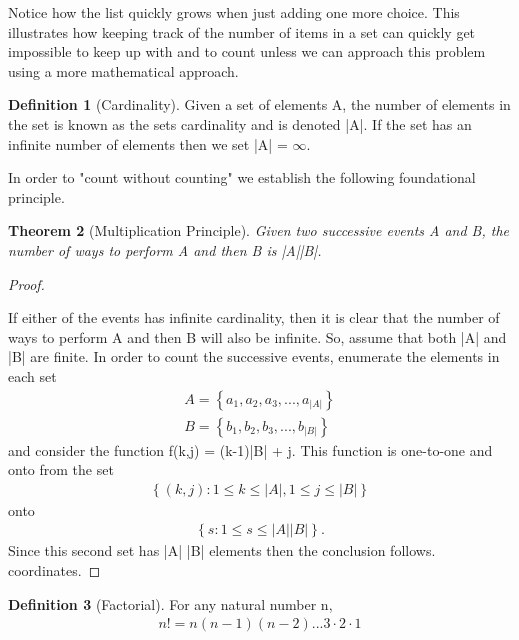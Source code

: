 \documentclass[10pt,]{book}
\theoremstyle{plain}
\newtheorem{theorem}{Theorem}[section]
\theoremstyle{definition}
\newtheorem{definition}[theorem]{Definition}
\theoremstyle{definition}
\numberwithin{equation}{section}
\begin{document}
Notice how the list quickly grows when just adding one more choice. This illustrates how keeping track of the number of items in a set can quickly get impossible to keep up with and to count unless we can approach this problem using a more mathematical approach.
%
\begin{definition}[Cardinality]\label{definition-17}
Given a set of elements A, the number of elements in the 
		set is known as the sets cardinality and is denoted |A|. If the set has 
		an infinite number of elements then we set |A| = \(\infty\).
		\end{definition}
\par
In order to "count without counting" we establish the following 
	foundational principle.%
\begin{theorem}[Multiplication Principle]\label{theorem-9}
Given two successive events A and B, the number of ways 
		to perform A and then B is |A||B|.
		\end{theorem}
\begin{proof}\hypertarget{proof-6}{}
If either of the events has infinite cardinality, then it is 
			clear
			that the number of ways to perform A and then B will also be 
			infinite. So, assume that both |A| and |B| are finite.
			In order to count the successive events, enumerate the elements in
			each set
			\begin{gather*}
A = \left \{ a_1, a_2, a_3, ... , a_{|A|} \right \}\\
B = \left \{  b_1, b_2, b_3, ... , b_{|B|} \right \}
\end{gather*}
			and consider the function f(k,j) = (k-1)|B| + j. This function is 
			one-to-one and onto from the set 
			\begin{gather*}
\left \{ (k,j): 1 \le k \le |A|, 1 \le j \le |B| \right \} 
\end{gather*} 
			onto 
			\begin{gather*}
\left \{ s : 1 \le s \le |A| |B| \right \}.
\end{gather*} 
			Since this
			second set has |A| |B| elements then the conclusion follows. 
			coordinates.%
\end{proof}
\begin{definition}[Factorial]\label{definition-18}
For any natural number n, 
		\begin{gather*}
n! = n(n-1)(n-2) ... 3 \cdot 2 \cdot 1
\end{gather*}
\end{definition}
\end{document}
